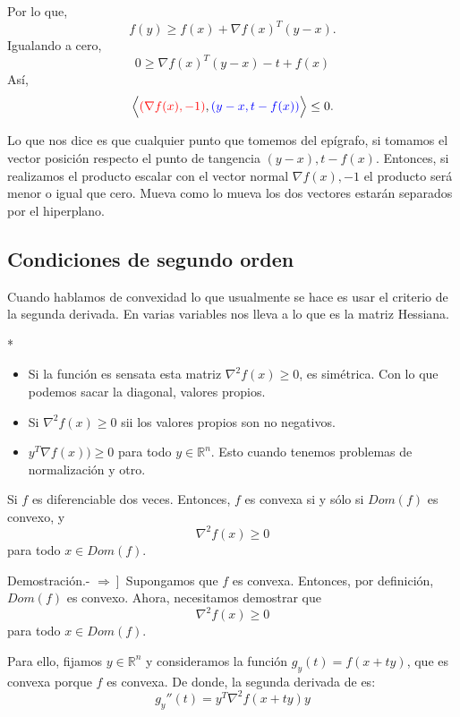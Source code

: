 \begin{paracol}{2}
Por lo que,
$$f(y)\geq f(x)+\nabla f(x)^T(y-x).$$
Igualando a cero,
$$0\geq \nabla f(x)^T(y-x)-t+f(x)$$
Así,
$$\Big\langle{\color{red}\left(\nabla f(x),-1\right)},{\color{blue}\left(y-x,t-f(x)\right)}\Big\rangle\leq 0.$$

Lo que nos dice es que cualquier punto que tomemos del epígrafo, si tomamos el vector posición respecto el punto de tangencia $(y-x),t-f(x)$. Entonces, si realizamos el producto escalar con el vector normal $\nabla f(x),-1$ el producto será menor o igual que cero. Mueva como lo mueva los dos vectores estarán separados por el hiperplano.


\subsection{Condiciones de segundo orden}

\begin{tcolorbox}[colframe=white]
    Cuando hablamos de convexidad lo que usualmente se hace es usar el criterio de la segunda derivada. En varias variables nos lleva a lo que es la matriz Hessiana. 
\end{tcolorbox}

\switchcolumn[1]*{\noindent\scriptsize
    \begin{itemize}
	\item Si la función es sensata esta matriz $\nabla^2 f(x)\geq 0$, es simétrica. Con lo que podemos sacar la diagonal, valores propios.
	\item Si $\nabla^2 f(x)\geq 0$ sii los valores propios son no negativos.
	\item $y^T\nabla f(x))\geq 0$ para todo $y\in \mathbb{R}^n$. Esto cuando tenemos problemas de normalización y otro.
    \end{itemize}
}
\switchcolumn[0]\noindent
{\color{blue}
\begin{teo} Si $f$ es diferenciable dos veces. Entonces, $f$ es convexa si y sólo si $Dom(f)$ es convexo, y
    $$\nabla^2 f(x)\geq 0$$
    para todo $x\in Dom(f)$.

    Demostración.-\; $\left.\Rightarrow\right]$ Supongamos que $f$ es convexa. Entonces, por definición, $Dom(f)$ es convexo. Ahora, necesitamos demostrar que 
    $$\nabla^2 f(x) \geq 0$$ 
    para todo $x \in Dom(f)$.

    Para ello, fijamos $y \in \mathbb{R}^n$ y consideramos la función $g_y(t) = f(x+ty)$, que es convexa porque $f$ es convexa. De donde, la segunda derivada de es:
    $$g_y''(t) = y^T \nabla^2 f(x+ty) y$$


\end{teo}}
\end{paracol}
